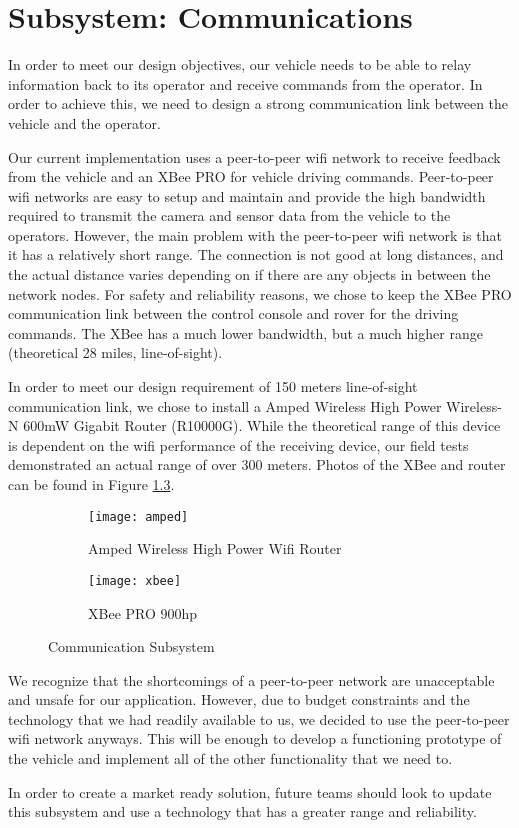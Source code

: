 \chapter{Subsystem: Communications} \label{chap:communications}


In order to meet our design objectives, our vehicle needs to be able to relay information back to its operator and receive commands from the operator.  In order to achieve this, we need to design a strong communication link between the vehicle and the operator.

Our current implementation uses a peer-to-peer wifi network to receive feedback from the vehicle and an XBee PRO for vehicle driving commands.  Peer-to-peer wifi networks are easy to setup and maintain and provide the high bandwidth required to transmit the camera and sensor data from the vehicle to the operators. However, the main problem with the peer-to-peer wifi network is that it has a relatively short range. The connection is not good at long distances, and the actual distance varies depending on if there are any objects in between the network nodes. For safety and reliability reasons, we chose to keep the XBee PRO communication link between the control console and rover for the driving commands. The XBee has a much lower bandwidth, but a much higher range (theoretical 28 miles, line-of-sight).

In order to meet our design requirement of 150 meters line-of-sight communication link, we chose to install a  Amped Wireless High Power Wireless-N 600mW Gigabit Router (R10000G). While the theoretical range of this device is dependent on the wifi performance of the receiving device, our field tests demonstrated an actual range of over 300 meters. Photos of the XBee and router can be found in Figure \ref{fig:test}.

\begin{figure}[H]
	\centering
	\begin{subfigure}{.5\textwidth}
		\centering
		\texttt{[image: amped]}
		\caption{Amped Wireless High Power Wifi Router}
		\label{fig:sub1}
	\end{subfigure}%
	\begin{subfigure}{.5\textwidth}
		\centering
		\texttt{[image: xbee]}
		\caption{XBee PRO 900hp}
		\label{fig:sub2}
	\end{subfigure}
	\caption{Communication Subsystem}
	\label{fig:test}
\end{figure}

We recognize that the shortcomings of a peer-to-peer network are unacceptable and unsafe for our application. However, due to budget constraints and the technology that we had readily available to us, we decided to use the peer-to-peer wifi network anyways. This will be enough to develop a functioning prototype of the vehicle and implement all of the other functionality that we need to.

In order to create a market ready solution, future teams should look to update this subsystem and use a technology that has a greater range and reliability.